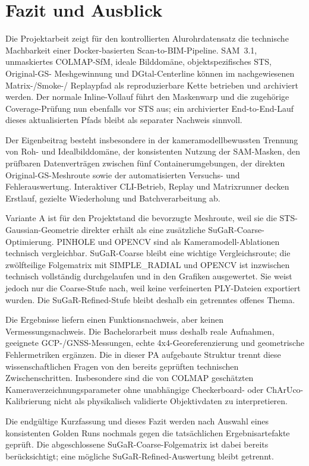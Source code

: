 \section{Fazit und Ausblick}

Die Projektarbeit zeigt für den kontrollierten Alurohrdatensatz die technische
Machbarkeit einer Docker-basierten Scan-to-BIM-Pipeline. SAM~3.1, unmaskiertes
COLMAP-SfM, ideale Bilddomäne, objektspezifisches STS, Original-GS-
Meshgewinnung und DGtal-Centerline können im nachgewiesenen Matrix-/Smoke-/
Replaypfad als reproduzierbare Kette betrieben und archiviert werden. Der
normale Inline-Vollauf führt den Maskenwarp und die zugehörige
Coverage-Prüfung nun ebenfalls vor STS aus; ein archivierter End-to-End-Lauf
dieses aktualisierten Pfads bleibt als separater Nachweis sinnvoll.

Der Eigenbeitrag besteht insbesondere in der kameramodellbewussten Trennung von
Roh- und Idealbilddomäne, der konsistenten Nutzung der SAM-Masken, den
prüfbaren Datenverträgen zwischen fünf Containerumgebungen, der direkten
Original-GS-Meshroute sowie der automatisierten Versuchs- und
Fehlerauswertung. Interaktiver CLI-Betrieb, Replay und Matrixrunner decken
Erstlauf, gezielte Wiederholung und Batchverarbeitung ab.

Variante A ist für den Projektstand die bevorzugte Meshroute, weil sie die
STS-Gaussian-Geometrie direkter erhält als eine zusätzliche SuGaR-Coarse-
Optimierung. PINHOLE und OPENCV sind als Kameramodell-Ablationen technisch
vergleichbar. SuGaR-Coarse bleibt eine wichtige Vergleichsroute; die
zwölfteilige Folgematrix mit SIMPLE\_RADIAL und OPENCV ist inzwischen technisch
vollständig durchgelaufen und in den Grafiken ausgewertet. Sie weist jedoch
nur die Coarse-Stufe nach, weil keine verfeinerten PLY-Dateien exportiert
wurden. Die SuGaR-Refined-Stufe bleibt deshalb ein getrenntes offenes Thema.

Die Ergebnisse liefern einen Funktionsnachweis, aber keinen
Vermessungsnachweis. Die Bachelorarbeit muss deshalb reale Aufnahmen,
geeignete GCP-/GNSS-Messungen, echte 4x4-Georeferenzierung und geometrische
Fehlermetriken ergänzen. Die in dieser PA aufgebaute Struktur trennt diese
wissenschaftlichen Fragen von den bereits geprüften technischen
Zwischenschritten. Insbesondere sind die von COLMAP geschätzten
Kameraverzeichnungsparameter ohne unabhängige Checkerboard- oder
ChArUco-Kalibrierung nicht als physikalisch validierte Objektivdaten zu
interpretieren.

Die endgültige Kurzfassung und dieses Fazit werden nach Auswahl eines
konsistenten Golden Runs nochmals gegen die tatsächlichen Ergebnisartefakte
geprüft. Die abgeschlossene SuGaR-Coarse-Folgematrix ist dabei bereits
berücksichtigt; eine mögliche SuGaR-Refined-Auswertung bleibt getrennt.
